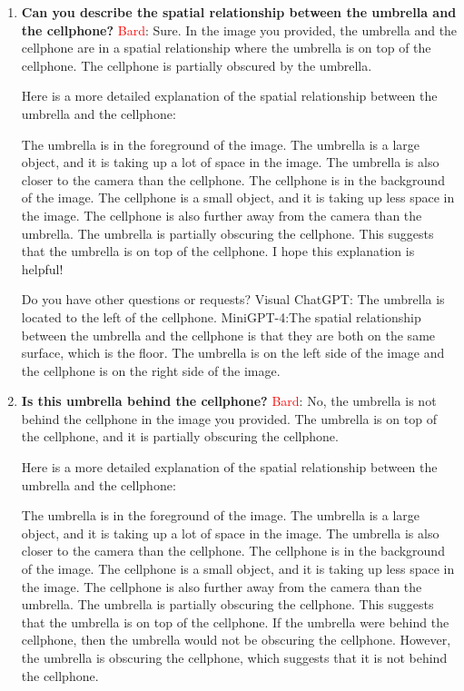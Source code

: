 \begin{enumerate}
    \item \textbf{Can you describe the spatial relationship between the umbrella and the cellphone?}
    \subitem \textcolor{Red}{Bard}: 
    Sure. In the image you provided, the umbrella and the cellphone are in a spatial relationship where the umbrella is on top of the cellphone. The cellphone is partially obscured by the umbrella.
    
    Here is a more detailed explanation of the spatial relationship between the umbrella and the cellphone:
    
    The umbrella is in the foreground of the image. The umbrella is a large object, and it is taking up a lot of space in the image. The umbrella is also closer to the camera than the cellphone.
    The cellphone is in the background of the image. The cellphone is a small object, and it is taking up less space in the image. The cellphone is also further away from the camera than the umbrella.
    The umbrella is partially obscuring the cellphone. This suggests that the umbrella is on top of the cellphone.
    I hope this explanation is helpful!
    
    Do you have other questions or requests?
    \subitem Visual ChatGPT: The umbrella is located to the left of the cellphone.
    \subitem MiniGPT-4:The spatial relationship between the umbrella and the cellphone is that they are both on the same surface, which is the floor. The umbrella is on the left side of the image and the cellphone is on the right side of the image. 
    \item \textbf{Is this umbrella behind the cellphone?}
    \subitem \textcolor{Red}{Bard}: 
    No, the umbrella is not behind the cellphone in the image you provided. The umbrella is on top of the cellphone, and it is partially obscuring the cellphone.
    
    Here is a more detailed explanation of the spatial relationship between the umbrella and the cellphone:
    
    The umbrella is in the foreground of the image. The umbrella is a large object, and it is taking up a lot of space in the image. The umbrella is also closer to the camera than the cellphone.
    The cellphone is in the background of the image. The cellphone is a small object, and it is taking up less space in the image. The cellphone is also further away from the camera than the umbrella.
    The umbrella is partially obscuring the cellphone. This suggests that the umbrella is on top of the cellphone.
    If the umbrella were behind the cellphone, then the umbrella would not be obscuring the cellphone. However, the umbrella is obscuring the cellphone, which suggests that it is not behind the cellphone.
    

\end{enumerate}

